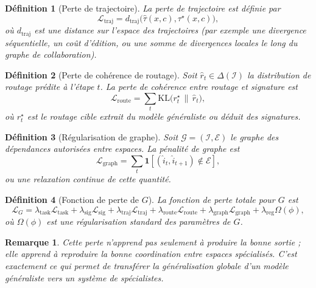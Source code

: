 \documentclass[11pt,a4paper]{article}
\newtheorem{definition}{Définition}[section]
\newtheorem{remark}{Remarque}[section]
\newcommand{\I}{\mathcal I}
\newcommand{\Gcal}{\mathcal G}
\newcommand{\1}{\mathbf 1}
\begin{document}
\begin{definition}[Perte de trajectoire]
La perte de trajectoire est définie par
\[
\mathcal L_{\mathrm{traj}}
=
d_{\mathrm{traj}}\!\bigl(\widehat{\tau}(x,c),\tau^\star(x,c)\bigr),
\]
où \(d_{\mathrm{traj}}\) est une distance sur l'espace des trajectoires
(par exemple une divergence séquentielle, un coût d'édition, ou une somme de divergences locales le long du graphe de collaboration).
\end{definition}

\begin{definition}[Perte de cohérence de routage]
Soit \(\widehat r_t\in\Delta(\I)\) la distribution de routage prédite à l'étape \(t\).
La perte de cohérence entre routage et signature est
\[
\mathcal L_{\mathrm{route}}
=
\sum_t
\mathrm{KL}\!\bigl(r_t^\star\,\|\,\widehat r_t\bigr),
\]
où \(r_t^\star\) est le routage cible extrait du modèle généraliste ou déduit des signatures.
\end{definition}

\begin{definition}[Régularisation de graphe]
Soit \(\Gcal=(\I,\mathcal E)\) le graphe des dépendances autorisées entre espaces.
La pénalité de graphe est
\[
\mathcal L_{\mathrm{graph}}
=
\sum_t
\mathbf 1\!\left[(\widehat i_t,\widehat i_{t+1})\notin \mathcal E\right],
\]
ou une relaxation continue de cette quantité.
\end{definition}

\begin{definition}[Fonction de perte de \(G\)]
La fonction de perte totale pour \(G\) est
\[
\mathcal L_G
=
\lambda_{\mathrm{task}}\mathcal L_{\mathrm{task}}
+
\lambda_{\mathrm{sig}}\mathcal L_{\mathrm{sig}}
+
\lambda_{\mathrm{traj}}\mathcal L_{\mathrm{traj}}
+
\lambda_{\mathrm{route}}\mathcal L_{\mathrm{route}}
+
\lambda_{\mathrm{graph}}\mathcal L_{\mathrm{graph}}
+
\lambda_{\mathrm{reg}}\Omega(\phi),
\]
où \(\Omega(\phi)\) est une régularisation standard des paramètres de \(G\).
\end{definition}

\begin{remark}
Cette perte n'apprend pas seulement à produire la bonne sortie ;
elle apprend à reproduire la bonne \emph{coordination} entre espaces spécialisés.
C'est exactement ce qui permet de transférer la généralisation globale d'un modèle généraliste vers un système de spécialistes.
\end{remark}
\end{document}
